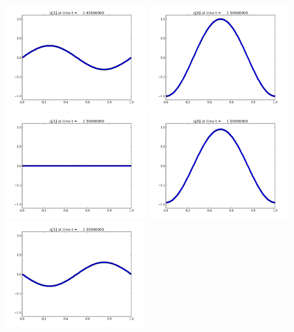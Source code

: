 \documentclass[11pt]{article}
\begin{document}
\includegraphics[width=0.475\textwidth]{frame0029fig1.png}
\vskip 10pt 
\includegraphics[width=0.475\textwidth]{frame0030fig0.png}
\includegraphics[width=0.475\textwidth]{frame0030fig1.png}
\vskip 10pt 
\includegraphics[width=0.475\textwidth]{frame0031fig0.png}
\includegraphics[width=0.475\textwidth]{frame0031fig1.png}
\end{document}
